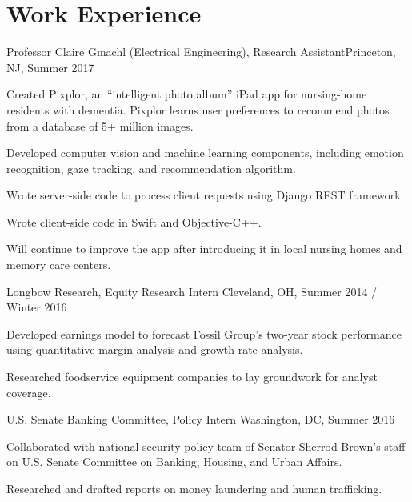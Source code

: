 \documentclass[12pt]{my_resume}
\begin{document}
\section{Work Experience}

\begin{resitem}{Professor Claire Gmachl (Electrical Engineering), Research %
Assistant}{Princeton, NJ, Summer 2017}
  \item Created Pixplor, an “intelligent photo album” iPad app for %
  nursing-home residents with dementia. Pixplor learns user preferences %
  to recommend photos from a database of 5+ million images.
  \item Developed computer vision and machine learning components, %
  including emotion recognition, gaze tracking, and recommendation %
  algorithm.
  \item Wrote server-side code to process client requests using Django %
  REST framework.
  \item Wrote client-side code in Swift and Objective-C++.
  \item Will continue to improve the app after introducing it in local %
  nursing homes and memory care centers.
\end{resitem}

\vspace{-8pt}

\begin{resitem}{Longbow Research, Equity Research Intern}%
{Cleveland, OH, Summer 2014 / Winter 2016}
  \item Developed earnings model to forecast Fossil Group's two-year %
  stock performance using quantitative margin analysis and growth rate %
  analysis.
  \item Researched foodservice equipment companies to lay groundwork %
  for analyst coverage.
\end{resitem}

\vspace{-8pt}

\begin{resitem}{U.S. Senate Banking Committee, Policy Intern}%
{Washington, DC, Summer 2016}
  \item Collaborated with national security policy team of Senator %
  Sherrod Brown's staff on U.S. Senate Committee on Banking, Housing, and %
  Urban Affairs.
  \item Researched and drafted reports on money laundering and human %
  trafficking.
\end{resitem}
\end{document}

